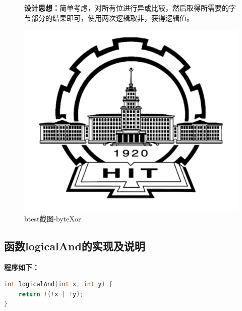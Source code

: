 \begin{figure}[H]
\begin{minipage}[c]{0.5\linewidth}
		
\textbf{设计思想：}简单考虑，对所有位进行异或比较，然后取得所需要的字节部分的结果即可，使用两次逻辑取非，获得逻辑值。
		
\end{minipage}
\begin{minipage}[c]{0.4\linewidth}
\centering
\includegraphics[width=0.9\linewidth]{figures/HIT}
\caption{btest截图-byteXor}
\label{fig:byteXor}
\end{minipage}
\end{figure}

\subsection{函数logicalAnd的实现及说明}
\textbf{程序如下：}
\begin{lstlisting}[language = c]
int logicalAnd(int x, int y) {
	return !(!x | !y);
}
\end{lstlisting}

